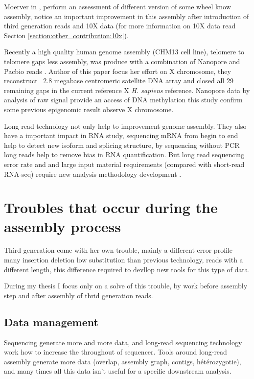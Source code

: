 \documentclass[./main.tex]{subfiles}
\begin{document}
Moerver \citeauthor{dnAQET} in \cite{dnAQET}, perform an assessment of different version of some wheel know assembly, \citeauthor{dnAQET} notice an important improvement in this assembly after introduction of third generation reads and 10X data (for more information on 10X data read Section \ref{section:other_contribution:10x}).

Recently a high quality human genome assembly (CHM13 cell line), telomere to telomere gaps less assembly, was produce with a combination of Nanopore and Pacbio reads \cite{telomere2telomere}. Author of this paper focus her effort on X chromosome, they reconstruct ~2.8 megabase centromeric satellite DNA array and closed all 29 remaining gaps in the current reference X \textit{H. sapiens} reference. Nanopore data by analysis of raw signal provide an access of DNA methylation this study confirm some previous epigenomic result observe X chromosome.

Long read technology not only help to improvement genome assembly. They also have a important impact in RNA study, sequencing mRNA from begin to end help to detect new isoform and splicing structure, by sequencing without PCR long reads help to remove bias in RNA quantification. But long read sequencing error rate and and large input material requirements (compared with short-read RNA-seq) require new analysis methodology development \cite{review_lr_rna}. 

\section{Troubles that occur during the assembly process}

Third generation come with her own trouble, mainly a different error profile many insertion deletion low substitution than previous technology, reads with a different length, this difference required to devllop new tools for this type of data.

During my thesis I focus only on a solve of this trouble, by work before assembly step and after assembly of thrid generation reads.

\subsection{Data management}

Sequencing generate more and more data, and long-read sequencing technology work how to increase the throughout of sequencer. Tools around long-read assembly generate more data (overlap, assembly graph, contigs, hétérozygotie), and many times all this data isn't useful for a specific downstream analysis.
\end{document}
